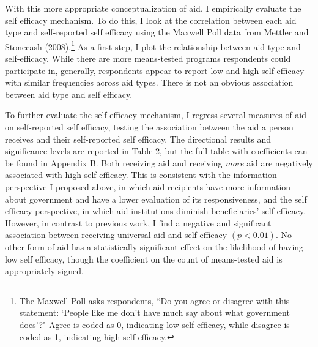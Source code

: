 \documentclass[12pt]{paper}
\begin{document}
With this more appropriate conceptualization of aid, I empirically evaluate the self efficacy mechanism. To do this, I look at the correlation between each aid type and self-reported self efficacy using the Maxwell Poll data from Mettler and Stonecash (2008).\footnote{The Maxwell Poll asks respondents, ``Do you agree or disagree with this statement: `People like me don’t have much say about what government does'?" Agree is coded as 0, indicating low self efficacy, while disagree is coded as 1, indicating high self efficacy.} As a first step, I plot the relationship between aid-type and self-efficacy. While there are more means-tested programs respondents could participate in, generally, respondents appear to report low and high self efficacy with similar frequencies across aid types. There is not an obvious association between aid type and self efficacy.

To further evaluate the self efficacy mechanism, I regress several measures of aid on self-reported self efficacy, testing the association between the aid a person receives and their self-reported self efficacy. The directional results and significance levels are reported in Table 2, but the full table with coefficients can be found in Appendix B. Both receiving aid and receiving \textit{more} aid are negatively associated with high self efficacy. This is consistent with the information perspective I proposed above, in which aid recipients have more information about government and have a lower evaluation of its responsiveness, and the self efficacy perspective, in which aid institutions diminish beneficiaries' self efficacy. However, in contrast to previous work, I find a negative and significant association between receiving universal aid and self efficacy $(p < 0.01)$. No other form of aid has a statistically significant effect on the likelihood of having low self efficacy, though the coefficient on the count of means-tested aid is appropriately signed. 
\end{document}
